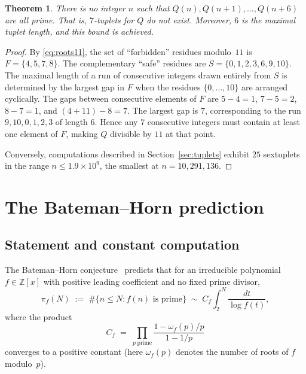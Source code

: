 \documentclass[11pt,a4paper]{article}
\theoremstyle{plain}
\newtheorem{theorem}{Theorem}
\theoremstyle{definition}
\theoremstyle{remark}
\begin{document}
\begin{theorem}\label{thm:7tuplet}
There is no integer $n$ such that $Q(n), Q(n{+}1), \ldots, Q(n{+}6)$ are all prime. That is, $7$-tuplets for $Q$ do not exist. Moreover, $6$ is the maximal tuplet length, and this bound is achieved.
\end{theorem}

\begin{proof}
By \eqref{eq:roots11}, the set of ``forbidden'' residues modulo~$11$ is $F = \{4, 5, 7, 8\}$. The complementary ``safe'' residues are $S = \{0, 1, 2, 3, 6, 9, 10\}$. The maximal length of a run of consecutive integers drawn entirely from $S$ is determined by the largest gap in $F$ when the residues $\{0, \ldots, 10\}$ are arranged cyclically. The gaps between consecutive elements of $F$ are $5-4=1$, $7-5=2$, $8-7=1$, and $(4+11)-8 = 7$. The largest gap is $7$, corresponding to the run $9, 10, 0, 1, 2, 3$ of length $6$. Hence any $7$ consecutive integers must contain at least one element of $F$, making $Q$ divisible by $11$ at that point.

Conversely, computations described in Section~\ref{sec:tuplets} exhibit $25$ sextuplets in the range $n \le 1.9 \times 10^9$, the smallest at $n = 10{,}291{,}136$.
\end{proof}


\section{The Bateman--Horn prediction}
\label{sec:BH}

\subsection{Statement and constant computation}

The Bateman--Horn conjecture~\cite{bateman1962} predicts that for an irreducible polynomial $f \in \mathbb{Z}[x]$ with positive leading coefficient and no fixed prime divisor,
\begin{equation}\label{eq:BH}
\pi_f(N) \;:=\; \#\{n \le N : f(n) \text{ is prime}\} \;\sim\; C_f \int_2^N \frac{dt}{\log f(t)},
\end{equation}
where the product
\begin{equation}\label{eq:BHconst}
C_f \;=\; \prod_{p\;\text{prime}} \frac{1 - \omega_f(p)/p}{1 - 1/p}
\end{equation}
converges to a positive constant (here $\omega_f(p)$ denotes the number of roots of $f$ modulo~$p$).
\end{document}
